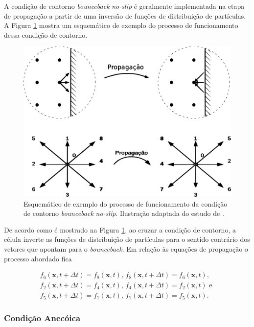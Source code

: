 A condição de contorno \textit{bounceback} \textit{no-slip} é geralmente implementada na etapa de propagação a partir de uma inversão de funções de distribuição de partículas. A Figura \ref{fig:bounceback} mostra um esquemático de exemplo do processo de funcionamento dessa condição de contorno. 

\begin{figure}[ht!]
\centering
  \includegraphics[width=.65\linewidth]{figuras/bounceback.pdf}
  \caption[Processo de funcionamento do \textit{bounceback} \textit{no-slip}]{Esquemático de exemplo do processo de funcionamento da condição de contorno \textit{bounceback} \textit{no-slip}. Ilustração adaptada do estudo de .}
  \label{fig:bounceback}
\end{figure}

De acordo como é mostrado na Figura \ref{fig:bounceback}, ao cruzar a condição de contorno, a célula inverte as funções de distribuição de partículas para o sentido contrário dos vetores que apontam para o \textit{bounceback}. Em relação às equações de propagação o processo abordado fica

\begin{gather*}
  f_{6}(\textbf{x}, t + \Delta t) = f_{8}(\textbf{x}, t)\text{,  } f_{8}(\textbf{x}, t + \Delta t) = f_{6}(\textbf{x}, t), \\
  f_{2}(\textbf{x}, t + \Delta t) = f_{4}(\textbf{x}, t)\text{,  } f_{4}(\textbf{x}, t + \Delta t) = f_{2}(\textbf{x}, t) \text{ e }\\
  f_{5}(\textbf{x}, t + \Delta t) = f_{7}(\textbf{x}, t)\text{,  } f_{7}(\textbf{x}, t + \Delta t) = f_{5}(\textbf{x}, t).
\label{eq:bounceback}
\end{gather*}

\subsubsection{Condição Anecóica}

